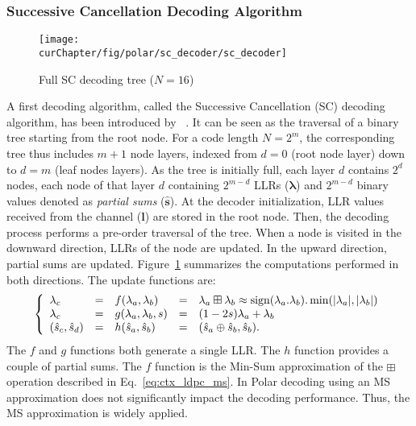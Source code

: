 \subsubsection{Successive Cancellation Decoding Algorithm}

\begin{figure}[htp]
  \centering
  \texttt{[image: \\curChapter/fig/polar/sc\_decoder/sc\_decoder]}
  \caption{Full SC decoding tree ($N = 16$)}
  \label{fig:ctx_polar_sc_decoder}
\end{figure}

A first decoding algorithm, called the Successive Cancellation (SC) decoding
algorithm, has been introduced by \Arikan~\cite{Arikan2009}. It can be seen as
the traversal of a binary tree starting from the root node. For a code length
$N=2^m$, the corresponding tree thus includes $m + 1$ node layers, indexed from
$d=0$ (root node layer) down to $d=m$ (leaf nodes layers). As the tree is
initially full, each layer $d$ contains $2^d$ nodes, each node of that layer $d$
containing $2^{m-d}$ LLRs ($\bm{\lambda}$) and $2^{m-d}$ binary values denoted
as \textit{partial sums} ($\bm{\hat{s}}$). At the decoder initialization, LLR
values received from the channel ($\bm{l}$) are stored in the root node. Then,
the decoding process performs a pre-order traversal of the tree. When a node is
visited in the downward direction, LLRs of the node are updated. In the upward
direction, partial sums are updated. Figure~\ref{fig:ctx_polar_sc_decoder}
summarizes the computations performed in both directions. The update functions
are:
\begin{eqnarray}
\left\{\begin{array}{l c l c l}
\lambda_c &=& f(\lambda_a,\lambda_b) &=& \lambda_a \boxplus \lambda_b \approx \operatorname*{sign}(\lambda_a.\lambda_b).\min(|\lambda_a|,|\lambda_b|)\\
\lambda_c &=& g(\lambda_a,\lambda_b,s)&=&(1-2s)\lambda_a+\lambda_b\\
(\hat{s}_{c}, \hat{s}_{d}) &=& h(\hat{s}_{a}, \hat{s}_{b}) &=& (\hat{s}_{a} \oplus \hat{s}_{b}, \hat{s}_{b}).
\end{array}\right.
\label{eq:ctx_polar_f_g_h}
\end{eqnarray}
The $f$ and $g$ functions both generate a single LLR. The $h$ function provides
a couple of partial sums. The $f$ function is the Min-Sum approximation of the
$\boxplus$ operation described in Eq.~\ref{eq:ctx_ldpc_ms}. In Polar decoding
using an MS approximation does not significantly impact the decoding
performance. Thus, the MS approximation is widely applied.

